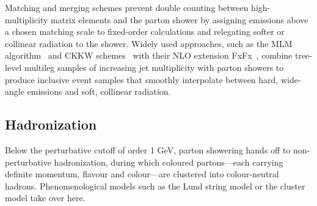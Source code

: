 Matching and merging schemes prevent double counting between high-multiplicity matrix elements and the parton shower by assigning emissions above a chosen matching scale to fixed-order calculations and relegating softer or collinear radiation to the shower. Widely used approaches, such as the MLM algorithm~\cite{MANGANO2002343} and CKKW schemes~\cite{Catani_2001} with their NLO extension FxFx~\cite{Frederix_2012}, combine tree-level multileg samples
of increasing jet multiplicity with parton showers to produce inclusive event samples that smoothly interpolate between hard, wide-angle emissions and soft, collinear radiation.

\subsection*{Hadronization}
\label{subsec:Hadronization}

Below the perturbative cutoff of order 1 GeV, parton showering hands off to non-perturbative hadronization, during which coloured partons—each carrying definite momentum, flavour and colour—are clustered into colour-neutral hadrons. Phenomenological models such as the Lund string model or the cluster model take over here.

